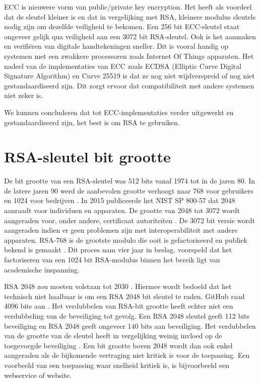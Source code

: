 ECC is nieuwere vorm van public/private key encryption. Het heeft als voordeel
dat de sleutel kleiner is en dat in vergelijking met RSA, kleinere modulus
sleutels nodig zijn om dezelfde veiligheid te bekomen. Een 256 bit ECC-sleutel
staat ongeveer gelijk qua veiligheid aan een 3072 bit RSA-sleutel. Ook is het
aanmaken en verifiëren van digitale handtekeningen sneller.
\autocite{HighSpeedHighSecuritySignatures} Dit is vooral handig op systemen met
een zwakkere processoren zoals Internet Of Things apparaten. Het nadeel van de
implementaties van ECC zoals ECDSA (Elliptic Curve Digital Signature Algorithm)
en Curve 25519 is dat ze nog niet wijdverspreid of nog niet gestandaardiseerd
zijn. Dit zorgt ervoor dat compatibiliteit met andere systemen niet zeker is.

We kunnen concluderen dat tot ECC-implementaties verder uitgewerkt en
gestandaardiseerd zijn, het best is om RSA te gebruiken.

\section{RSA-sleutel bit grootte}
\label{sec:rsa-sleutel-bit-grootte}

De bit grootte van een RSA-sleutel was 512 bits vanaf 1974 tot in de jaren 80.
In de latere jaren 90 werd de aanbevolen grootte verhoogt naar 768 voor
gebruikers en 1024 voor bedrijven \autocite{OriginalRSAKeySizeRecommendations}.
In 2015 publiceerde het NIST SP 800-57 dat 2048 aanraadt voor individuen en
apparaten. De grootte van 2048 tot 3072 wordt aangeraden voor, onder andere,
certificaat autoriteiten
\autocite{NISTKeyManagementRecommendationApplicationSpecific}. De 3072 bit
versie wordt aangeraden indien er geen problemen zijn met interoperabiliteit met
andere apparaten. RSA-768 is de grootste modulo die ooit is gefactoriseerd en
publiek bekend is gemaakt \autocite{FactorizationOf768BitRSA}. Dit proces nam
vier jaar in beslag. \textcite{FactorizationOf768BitRSA} voorspeld dat het
factoriseren van een 1024 bit RSA-modulus binnen het bereik ligt van academische
inspanning.

RSA 2048 zou moeten volstaan tot 2030
\autocite{NISTKeyManagementRecommendationGeneral, NISTAlgorithmesAndKeyLengths}.
Hiermee wordt bedoeld dat het technisch niet haalbaar is om een RSA 2048 bit
sleutel te raden. GitHub raad 4096 bits aan
\autocite{GithubGeneratingANewGPGKey}. Het verdubbelen van RSA-bit grootte heeft
echter niet een verdubbeling van de beveiliging tot gevolg. Een RSA 2048 sleutel
geeft 112 bits beveiliging en RSA 2048 geeft ongeveer 140 bits aan beveiliging.
Het verdubbelen van de grootte van de sleutel heeft in vergelijking weinig
invloed op de toegevoegde beveiliging \autocite{GnuPGFAQ}. Een bit grootte boven
2048 wordt dan ook enkel aangeraden als de bijkomende vertraging niet kritiek is
voor de toepassing. Een voorbeeld van een toepassing waar snelheid kritiek is,
is bijvoorbeeld een webservice of website.

